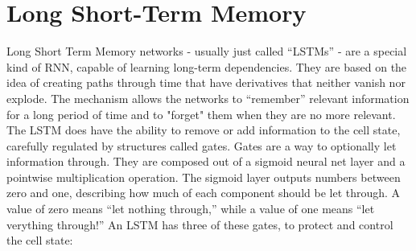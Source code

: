 \section{Long Short-Term Memory}
Long Short Term Memory networks - usually just called “LSTMs” - are a special kind of RNN, capable of learning long-term dependencies.\newline\newline
They are based on the idea of creating paths through time that have derivatives that neither vanish nor explode.\newline\newline
The mechanism allows the networks to “remember” relevant information for a long period of time and to "forget" them when they are no more relevant.
\newline\newline
The LSTM does have the ability to remove or add information to the cell state, carefully regulated by structures called gates. Gates are a way to optionally let information through. They are composed out of a sigmoid neural net layer and a pointwise multiplication operation. The sigmoid layer outputs numbers between zero and one, describing how much of each component should be let through. A value of zero means “let nothing through,” while a value of one means “let 
verything through!”
\newline\newline
An LSTM has three of these gates, to protect and control the cell state:
